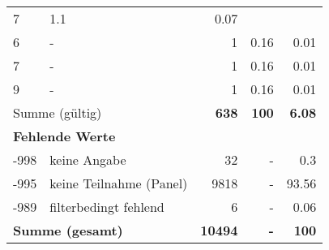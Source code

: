 \begin{longtable}{lXrrr}
       \num{7} &
       \num[round-mode=places,round-precision=2]{1,1} &
         \num[round-mode=places,round-precision=2]{0,07} \\

     6 &
     \multicolumn{1}{X}{ -  } &


       \num{1} &
       \num[round-mode=places,round-precision=2]{0,16} &
         \num[round-mode=places,round-precision=2]{0,01} \\

     7 &
     \multicolumn{1}{X}{ -  } &


       \num{1} &
       \num[round-mode=places,round-precision=2]{0,16} &
         \num[round-mode=places,round-precision=2]{0,01} \\

     9 &
     \multicolumn{1}{X}{ -  } &


       \num{1} &
       \num[round-mode=places,round-precision=2]{0,16} &
         \num[round-mode=places,round-precision=2]{0,01} \\
     \midrule
     \multicolumn{2}{l}{Summe (gültig)} &
       \textbf{\num{638}} &
     \textbf{100} &
       \textbf{\num[round-mode=places,round-precision=2]{6,08}} \\
     \multicolumn{5}{l}{\textbf{Fehlende Werte}}\\
       -998 &
       keine Angabe &
         \num{32} &
        - &
         \num[round-mode=places,round-precision=2]{0,3} \\
       -995 &
       keine Teilnahme (Panel) &
         \num{9818} &
        - &
         \num[round-mode=places,round-precision=2]{93,56} \\
       -989 &
       filterbedingt fehlend &
         \num{6} &
        - &
         \num[round-mode=places,round-precision=2]{0,06} \\
     \midrule
     \multicolumn{2}{l}{\textbf{Summe (gesamt)}} &
          \textbf{\num{10494}} &
        \textbf{-} &
        \textbf{100} \\
     \bottomrule
     \end{longtable}
     
